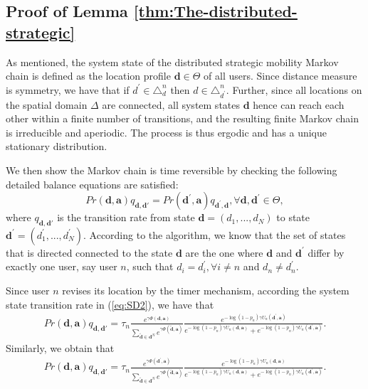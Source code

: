 \subsection{Proof of Lemma \ref{thm:The-distributed-strategic}} \label{proof3}
As mentioned, the system state of the distributed strategic mobility Markov chain is defined as the location profile
$\boldsymbol{d}\in\Theta$ of all users. Since distance measure is symmetry, we
have that if $d^{'}\in\mathcal{\triangle}_{d}^{n}$ then $d\in\mathcal{\triangle}_{d^{'}}^{n}$.
Further, since all locations on the spatial domain $\Delta$ are connected,
all system states $\boldsymbol{d}$ hence can reach each other within a finite
number of transitions, and the resulting finite Markov chain is irreducible
and aperiodic. The process is thus ergodic and has a unique stationary
distribution.

We then show the Markov chain is time reversible by checking the following
detailed balance equations are satisfied:\begin{equation}
Pr(\boldsymbol{d},\boldsymbol{a})q_{\boldsymbol{d},\boldsymbol{d}'}=Pr(\boldsymbol{d}^{'},\boldsymbol{a})q_{\boldsymbol{d}^{'},\boldsymbol{d}},\forall \boldsymbol{d},\boldsymbol{d}^{'}\in\Theta,\label{eq:SD1}\end{equation}
where $q_{\boldsymbol{d},\boldsymbol{d}'}$ is the transition rate from state $\boldsymbol{d}=(d_{1},...,d_{N})$
to state $\boldsymbol{d}^{'}=(d_{1}^{'},...,d_{N}^{'})$. According to the algorithm,
we know that the set of states that is directed connected to the state
$\boldsymbol{d}$ are the one where $\boldsymbol{d}$ and $\boldsymbol{d}^{'}$ differ by exactly one user,
say user $n$, such that $d_{i}=d_{i}^{'}, \forall i\neq n$ and $d_{n}\neq d_{n}^{'}$.

Since user $n$ revises its location by the timer mechanism, according the system state transition rate in (\ref{eq:SD2}), we have that\begin{align}
   Pr(\boldsymbol{d},\boldsymbol{a})q_{\boldsymbol{d},\boldsymbol{d}'} = \tau_{n}\frac{e^{\gamma\Phi(\boldsymbol{d},\boldsymbol{a})}}{\sum_{\tilde{\boldsymbol{d}}\in\mathcal{\boldsymbol{d}}^{N}}e^{\gamma\Phi(\tilde{\boldsymbol{d}},\boldsymbol{a})}}\frac{e^{-\log(1-p_{n})\gamma U_{n}(\boldsymbol{d}^{'},\boldsymbol{a})}}{e^{-\log(1-p_{n})\gamma U_{n}(\boldsymbol{d},\boldsymbol{a})}+e^{-\log(1-p_{n})\gamma U_{n}(\boldsymbol{d}^{'},\boldsymbol{a})}}.\label{eq:SD3}\end{align}
Similarly, we obtain that\begin{align}
   Pr(\boldsymbol{d},\boldsymbol{a})q_{\boldsymbol{d},\boldsymbol{d}'} = \tau_{n}\frac{e^{\gamma\Phi(\boldsymbol{d}^{'},\boldsymbol{a})}}{\sum_{\tilde{\boldsymbol{d}}\in\mathcal{\boldsymbol{d}}^{N}}e^{\gamma\Phi(\tilde{\boldsymbol{d}},\boldsymbol{a})}}\frac{e^{-\log(1-p_{n})\gamma U_{n}(\boldsymbol{d},\boldsymbol{a})}}{e^{-\log(1-p_{n})\gamma U_{n}(\boldsymbol{d},\boldsymbol{a})}+e^{-\log(1-p_{n})\gamma U_{n}(\boldsymbol{d}^{'},\boldsymbol{a})}}.\label{eq:SD4}\end{align}

